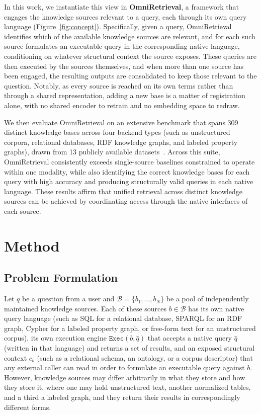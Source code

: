 \documentclass{llmxive}
\begin{document}
In this work, we instantiate this view in \textbf{OmniRetrieval}, a framework that engages the knowledge sources relevant to a query, each through its own query language (Figure~\ref{fig:concept}). Specifically, given a query, OmniRetrieval identifies which of the available knowledge sources are relevant, and for each such source formulates an executable query in the corresponding native language, conditioning on whatever structural context the source exposes. These queries are then executed by the sources themselves, and when more than one source has been engaged, the resulting outputs are consolidated to keep those relevant to the question. Notably, as every source is reached on its own terms rather than through a shared representation, adding a new base is a matter of registration alone, with no shared encoder to retrain and no embedding space to redraw.

We then evaluate OmniRetrieval on an extensive benchmark that spans 309 distinct knowledge bases across four backend types (such as unstructured corpora, relational databases, RDF knowledge graphs, and labeled property graphs), drawn from 13 publicly available datasets~\citep{SimpleQuestions, Spider, LCQuAD2, BEIR, Bird, QALD10, Text2Cypher}. Across this suite, OmniRetrieval consistently exceeds single-source baselines constrained to operate within one modality, while also identifying the correct knowledge bases for each query with high accuracy and producing structurally valid queries in each native language. These results affirm that unified retrieval across distinct knowledge sources can be achieved by coordinating access through the native interfaces of each source.

\section{Method}

\subsection{Problem Formulation}

Let $q$ be a question from a user and $\mathcal{B} = \{b_1, \ldots, b_N\}$ be a pool of independently maintained knowledge sources. Each of these sources $b \in \mathcal{B}$ has its own native query language (such as SQL for a relational database, SPARQL for an RDF graph, Cypher for a labeled property graph, or free-form text for an unstructured corpus), its own execution engine $\texttt{Exec}(b, \hat{q})$ that accepts a native query $\hat{q}$ (written in that language) and returns a set of results, and an exposed structural context $c_b$ (such as a relational schema, an ontology, or a corpus descriptor) that any external caller can read in order to formulate an executable query against $b$. However, knowledge sources may differ arbitrarily in what they store and how they store it, where one may hold unstructured text, another normalized tables, and a third a labeled graph, and they return their results in correspondingly different forms.
\end{document}
